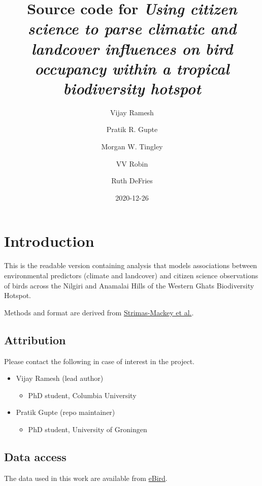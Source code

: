 \documentclass[]{article}
\title{Source code for \emph{Using citizen science to parse climatic and landcover influences on bird occupancy within a tropical biodiversity hotspot}}
\author{Vijay Ramesh \and Pratik R. Gupte \and Morgan W. Tingley \and VV Robin \and Ruth DeFries}
\date{2020-12-26}
\providecommand{\tightlist}{%
  \setlength{\itemsep}{0pt}\setlength{\parskip}{0pt}}
\begin{document}
\maketitle

{
\setcounter{tocdepth}{2}
\tableofcontents
}
\hypertarget{introduction}{%
\section{Introduction}\label{introduction}}

This is the readable version containing analysis that models associations between environmental predictors (climate and landcover) and citizen science observations of birds across the Nilgiri and Anamalai Hills of the Western Ghats Biodiversity Hotspot.

Methods and format are derived from \href{https://cornelllabofornithology.github.io/ebird-best-practices/}{Strimas-Mackey et al.}.

\hypertarget{attribution}{%
\subsection{Attribution}\label{attribution}}

Please contact the following in case of interest in the project.

\begin{itemize}
\tightlist
\item
  Vijay Ramesh (lead author)

  \begin{itemize}
  \tightlist
  \item
    PhD student, Columbia University
  \end{itemize}
\item
  Pratik Gupte (repo maintainer)

  \begin{itemize}
  \tightlist
  \item
    PhD student, University of Groningen
  \end{itemize}
\end{itemize}

\hypertarget{data-access}{%
\subsection{Data access}\label{data-access}}

The data used in this work are available from \href{http://ebird.org/data/download}{eBird}.
\end{document}
